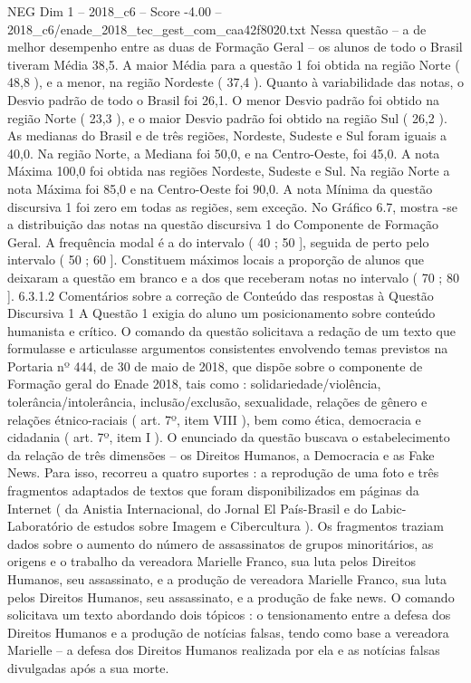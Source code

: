 \begin{textsample}{NEG Dim 1 – 2018\_c6 – Score -4.00 – 2018\_c6/enade\_2018\_tec\_gest\_com\_caa42f8020.txt}
Nessa questão – a de melhor desempenho entre as duas de Formação Geral – os alunos de todo o Brasil tiveram Média 38,5.
A maior Média para a questão 1 foi obtida na região Norte ( 48,8 ), e a menor, na região Nordeste ( 37,4 ).
Quanto à variabilidade das notas, o Desvio padrão de todo o Brasil foi 26,1.
O menor Desvio padrão foi obtido na região Norte ( 23,3 ), e o maior Desvio padrão foi obtido na região Sul ( 26,2 ).
As medianas do Brasil e de três regiões, Nordeste, Sudeste e Sul foram iguais a 40,0.
Na região Norte, a Mediana foi 50,0, e na Centro-Oeste, foi 45,0.
A nota Máxima 100,0 foi obtida nas regiões Nordeste, Sudeste e Sul.
Na região Norte a nota Máxima foi 85,0 e na Centro-Oeste foi 90,0.
A nota Mínima da questão discursiva 1 foi zero em todas as regiões, sem exceção.
No Gráfico 6.7, mostra -se a distribuição das notas na questão discursiva 1 do Componente de Formação Geral.
A frequência modal é a do intervalo ( 40 ; 50 ], seguida de perto pelo intervalo ( 50 ; 60 ].
Constituem máximos locais a proporção de alunos que deixaram a questão em branco e a dos que receberam notas no intervalo ( 70 ; 80 ]. 6.3.1.2 Comentários sobre a correção de Conteúdo das respostas à Questão Discursiva 1 A Questão 1 exigia do aluno um posicionamento sobre conteúdo humanista e crítico.
O comando da questão solicitava a redação de um texto que formulasse e articulasse argumentos consistentes envolvendo temas previstos na Portaria nº 444, de 30 de maio de 2018, que dispõe sobre o componente de Formação geral do Enade 2018, tais como : solidariedade/violência, tolerância/intolerância, inclusão/exclusão, sexualidade, relações de gênero e relações étnico-raciais ( art. 7º, item VIII ), bem como ética, democracia e cidadania ( art. 7º, item I ).
O enunciado da questão buscava o estabelecimento da relação de três dimensões – os Direitos Humanos, a Democracia e as Fake News.
Para isso, recorreu a quatro suportes : a reprodução de uma foto e três fragmentos adaptados de textos que foram disponibilizados em páginas da Internet ( da Anistia Internacional, do Jornal El País-Brasil e do Labic-Laboratório de estudos sobre Imagem e Cibercultura ).
Os fragmentos traziam dados sobre o aumento do número de assassinatos de grupos minoritários, as origens e o trabalho da vereadora Marielle Franco, sua luta pelos Direitos Humanos, seu assassinato, e a produção de vereadora Marielle Franco, sua luta pelos Direitos Humanos, seu assassinato, e a produção de fake news.
O comando solicitava um texto abordando dois tópicos : o tensionamento entre a defesa dos Direitos Humanos e a produção de notícias falsas, tendo como base a vereadora Marielle – a defesa dos Direitos Humanos realizada por ela e as notícias falsas divulgadas após a sua morte.

\end{textsample}
